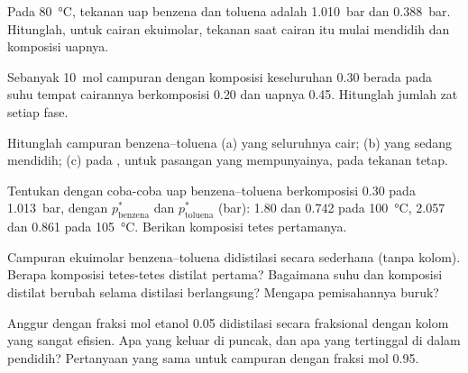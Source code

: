 \begin{exercise}[$\star$]\label{exo:b2:liquid-vapour-diagrams:2}
Pada \qty{80}{\degreeCelsius}, tekanan uap benzena dan toluena adalah
\qty{1.010}{bar} dan \qty{0.388}{bar}. Hitunglah, untuk cairan ekuimolar,
tekanan saat cairan itu mulai mendidih dan komposisi uapnya.
\end{exercise}

\begin{exercise}[$\star$]\label{exo:b2:liquid-vapour-diagrams:3}
Sebanyak \qty{10}{mol} campuran dengan komposisi keseluruhan 0.30 berada
pada suhu tempat cairannya berkomposisi 0.20 dan uapnya 0.45. Hitunglah
jumlah zat setiap fase.
\end{exercise}

\begin{exercise}[$\star$]\label{exo:b2:liquid-vapour-diagrams:4}
Hitunglah  campuran benzena--toluena (a) yang seluruhnya cair;
(b) yang sedang mendidih; (c) pada , untuk pasangan yang
mempunyainya, pada tekanan tetap.
\end{exercise}

\begin{exercise}[$\star\star$]\label{exo:b2:liquid-vapour-diagrams:5}
Tentukan dengan coba-coba  uap benzena--toluena berkomposisi
0.30 pada \qty{1.013}{bar}, dengan $p^*_{\text{benzena}}$ dan
$p^*_{\text{toluena}}$ (\unit{bar}): 1.80 dan 0.742 pada
\qty{100}{\degreeCelsius}, 2.057 dan 0.861 pada \qty{105}{\degreeCelsius}.
Berikan komposisi tetes pertamanya.
\end{exercise}

\begin{exercise}[$\star\star$]\label{exo:b2:liquid-vapour-diagrams:6}
Campuran ekuimolar benzena--toluena didistilasi secara sederhana (tanpa
kolom). Berapa komposisi tetes-tetes distilat pertama? Bagaimana suhu dan
komposisi distilat berubah selama distilasi berlangsung? Mengapa
pemisahannya buruk?
\end{exercise}

\begin{exercise}[$\star\star$]\label{exo:b2:liquid-vapour-diagrams:7}
Anggur dengan fraksi mol etanol 0.05 didistilasi secara fraksional dengan
kolom yang sangat efisien. Apa yang keluar di puncak, dan apa yang
tertinggal di dalam pendidih? Pertanyaan yang sama untuk campuran dengan
fraksi mol 0.95.
\end{exercise}

